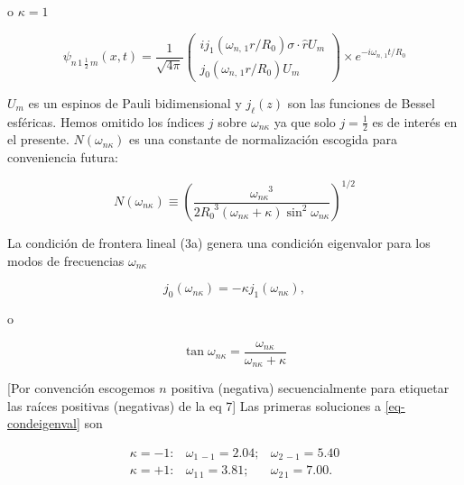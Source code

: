 o ${\kappa} = 1$

\begin{equation}\label{eq-deq-sol-k=1}
{\psi}_{n \, 1 \, \frac{1}{2} \, m} (x,t) = \frac{1}{\sqrt{4 \pi}} 
\left( 
\begin{array}{c}
i{j}_{1} ({\omega}_{n, \, 1} r / {R}_{0}) \sigma \cdot \hat{r} {U}_{m} \\
{j}_{0} ({\omega}_{n, \, 1} r / {R}_{0}) {U}_{m} 
\end{array}
\right) \times {e}^{- i {\omega}_{n, \, 1} t / {R}_{0}}
\end{equation}

${U}_{m}$ es un espinos de Pauli bidimensional y ${j}_{\ell}(z)$ son las funciones de Bessel esféricas. Hemos omitido los índices $j$ sobre ${\omega}_{n \kappa}$ ya que solo $j = \frac{1}{2}$ es de interés en el presente. $N({\omega}_{n \kappa})$ es una constante de normalización escogida para conveniencia futura:

\begin{equation}
N({\omega}_{n \kappa}) \equiv \left( \frac{{\omega}_{n \kappa}^{\phantom{n \kappa} 3}}{2 {R}_{0}^{\phantom{0} 3} ({\omega}_{n \kappa} + \kappa) \sin^{2} {\omega}_{n \kappa}} \right)^{1/2}
\end{equation}

La condición de frontera lineal (3a) genera una condición eigenvalor para los modos de frecuencias ${\omega}_{n \kappa}$

$$
{j}_{0}({\omega}_{n \kappa}) = - \kappa {j}_{1} ({\omega}_{n \kappa}),
$$

o 

\begin{equation}\label{eq-condeigenval}
\tan {\omega}_{n \kappa} = \frac{{\omega}_{n \kappa}}{{\omega}_{n \kappa} + \kappa}
\end{equation}

[Por convención escogemos $n$ positiva (negativa) secuencialmente para etiquetar las raíces positivas (negativas) de la eq 7] Las primeras soluciones a \eqref{eq-condeigenval} son 

\begin{equation}\label{eq-deq-sols}
\begin{array}{ccc}
\kappa = - 1: & {\omega}_{1 \, -1} = 2.04; & {\omega}_{2 \, -1} = 5.40 \\
\kappa = + 1: & {\omega}_{1 \, 1} = 3.81; & {\omega}_{2 \, 1} = 7.00.
\end{array}
\end{equation}

